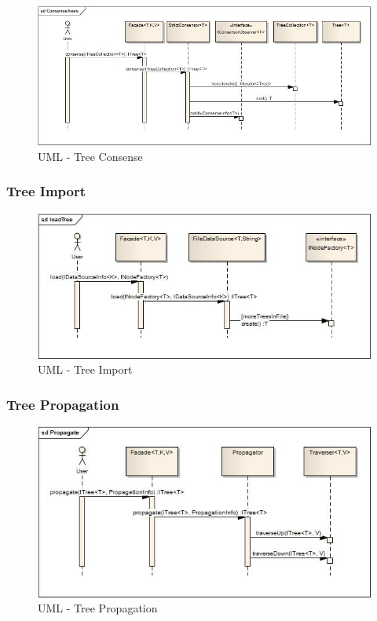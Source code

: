 \documentclass[a4paper,10pt]{article}
\begin{document}
   \begin{figure}
  \centering
  \includegraphics[scale=0.5]{images/ConsenseTrees.jpg}  
  \caption{UML - Tree Consense}
  \label{uml:ConsenseTrees}
  \end{figure} 
  
  
 \subsubsection{Tree Import}
 
   \begin{figure}
  \centering
  \includegraphics[scale=0.5]{images/loadTree.jpg}  
  \caption{UML - Tree Import}
  \label{uml:loadTree}
  \end{figure} 
  
  
 \subsubsection{Tree Propagation}
 
   \begin{figure}
  \centering
  \includegraphics[scale=0.5]{images/Propagate.jpg}  
  \caption{UML - Tree Propagation}
  \label{uml:Propagate}
  \end{figure} 
  
\end{document}
